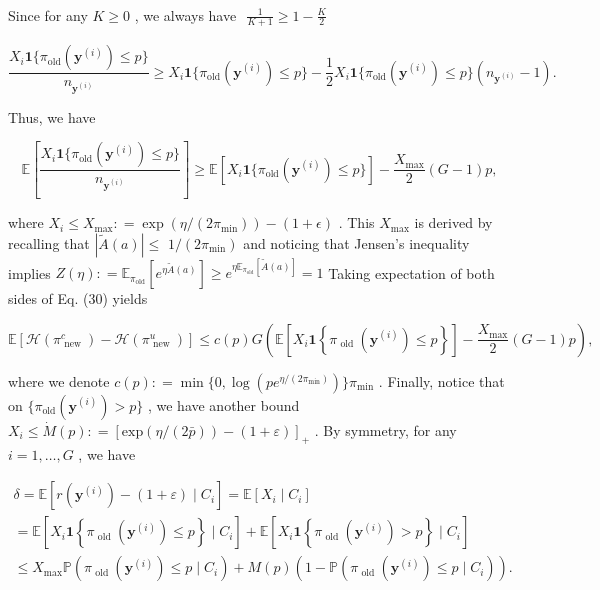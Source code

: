 \documentclass[
  10
]{article}
\begin{document}
Since for any \(K \geq 0\) , we always have
\(\begin{array} { r } { \frac { 1 } { K + 1 } \geq 1 - \frac { K } { 2 } } \end{array}\)

\[
\frac {X _ {i} \mathbf {1} \{\pi_ {\text {old}} (\mathbf {y} ^ {(i)}) \leq p \}}{n _ {\mathbf {y} ^ {(i)}}} \geq X _ {i} \mathbf {1} \{\pi_ {\text {old}} (\mathbf {y} ^ {(i)}) \leq p \} - \frac {1}{2} X _ {i} \mathbf {1} \{\pi_ {\text {old}} (\mathbf {y} ^ {(i)}) \leq p \} (n _ {\mathbf {y} ^ {(i)}} - 1).
\]

Thus, we have

\[
\mathbb {E} \left[ \frac {X _ {i} \mathbf {1} \{\pi_ {\mathrm{old}} (\mathbf {y} ^ {(i)}) \leq p \}}{n _ {\mathbf {y} ^ {(i)}}} \right] \geq \mathbb {E} [ X _ {i} \mathbf {1} \{\pi_ {\mathrm{old}} (\mathbf {y} ^ {(i)}) \leq p \} ] - \frac {X _ {\max}}{2} (G - 1) p,
\]

where
\(X _ { i } \le X _ { \mathrm { m a x } } : = \exp ( \eta / ( 2 \pi _ { \mathrm { m i n } } ) ) - ( 1 + \epsilon )\)
. This \(X _ { \mathrm { m a x } }\) is derived by recalling that
\(| \tilde { A } ( a ) | \leq\)
\(1 / ( 2 \pi _ { \mathrm { m i n } } )\) and noticing that Jensen's
inequality implies
\(Z ( \eta ) : = \mathbb { E } _ { \pi _ { \mathrm { o l d } } } [ e ^ { \eta \tilde { A } ( a ) } ] \geq e ^ { \eta \mathbb { E } _ { \pi _ { \mathrm { o l d } } } [ \tilde { A } ( a ) ] } = 1\)
Taking expectation of both sides of Eq. (30) yields

\[
\mathbb {E} \left[ \mathcal {H} \left(\pi_ {\text { new }} ^ {c}\right) - \mathcal {H} \left(\pi_ {\text { new }} ^ {u}\right) \right] \leq c (p) G \left(\mathbb {E} \left[ X _ {i} \mathbf {1} \left\{\pi_ {\text { old }} \left(\mathbf {y} ^ {(i)}\right) \leq p \right\} \right] - \frac {X _ {\max}}{2} (G - 1) p\right), \tag {31}
\]

where we denote
\(c ( p ) : = \operatorname* { m i n } \{ 0 , \log ( p e ^ { \eta / ( 2 \pi _ { \operatorname* { m i n } } ) } ) \} \pi _ { \operatorname* { m i n } }\)
. Finally, notice that on
\(\{ \pi _ { \mathrm { o l d } } ( \mathbf { y } ^ { ( i ) } ) > p \}\)
, we have another bound
\(X _ { i } \le \dot { M } ( p ) : = [ \mathrm { e x p } ( \eta / ( 2 \bar { p } ) ) - ( 1 + \varepsilon ) ] _ { + }\)
. By symmetry, for any \(i = 1 , \dots , G\) , we have

\[
\begin{array}{l} \delta = \mathbb {E} [ r (\mathbf {y} ^ {(i)}) - (1 + \varepsilon) \mid C _ {i} ] = \mathbb {E} [ X _ {i} \mid C _ {i} ] \\ = \mathbb {E} \left[ X _ {i} \mathbf {1} \left\{\pi_ {\text { old }} \left(\mathbf {y} ^ {(i)}\right) \leq p \right\} \mid C _ {i} \right] + \mathbb {E} \left[ X _ {i} \mathbf {1} \left\{\pi_ {\text { old }} \left(\mathbf {y} ^ {(i)}\right) > p \right\} \mid C _ {i} \right] \\ \leq X _ {\max} \mathbb {P} (\pi_ {\text { old }} (\mathbf {y} ^ {(i)}) \leq p \mid C _ {i}) + M (p) (1 - \mathbb {P} (\pi_ {\text { old }} (\mathbf {y} ^ {(i)}) \leq p \mid C _ {i})). \\ \end{array}
\]
\end{document}
